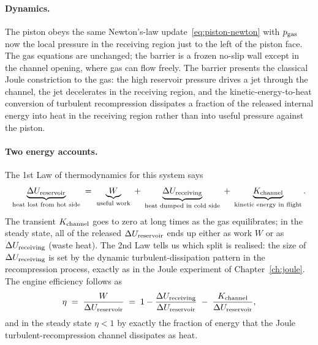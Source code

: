 \paragraph{Dynamics.}
The piston obeys the same Newton's-law update~\eqref{eq:piston-newton}
with $p_{\rm gas}$ now the local pressure in the receiving region
just to the left of the piston face. The gas equations are unchanged;
the barrier is a frozen no-slip wall except in the channel opening,
where gas can flow freely. The barrier presents the classical
Joule constriction to the gas: the high reservoir pressure drives a
jet through the channel, the jet decelerates in the receiving region,
and the kinetic-energy-to-heat conversion of turbulent
recompression dissipates a fraction of the released internal energy
into heat in the receiving region rather than into useful pressure
against the piston.

\paragraph{Two energy accounts.}
The 1st Law of thermodynamics for this system says
\begin{equation}\label{eq:piston-1st-law}
\underbrace{\Delta U_{\rm reservoir}}_{\text{heat lost from hot side}}
\;=\;
\underbrace{W}_{\text{useful work}}
\;+\;
\underbrace{\Delta U_{\rm receiving}}_{\text{heat dumped in cold side}}
\;+\;
\underbrace{K_{\rm channel}}_{\text{kinetic energy in flight}}.
\end{equation}
The transient $K_{\rm channel}$ goes to zero at long times as the gas
equilibrates; in the steady state, all of the released $\Delta U_{\rm reservoir}$
ends up either as work $W$ or as $\Delta U_{\rm receiving}$ (waste heat).
The 2nd Law tells us which split is realised: the size of
$\Delta U_{\rm receiving}$ is set by the dynamic
turbulent-dissipation pattern in the recompression process, exactly
as in the Joule experiment of Chapter~\ref{ch:joule}. The engine
efficiency follows as
\begin{equation}\label{eq:piston-eta-joule}
\eta \;=\; \frac{W}{\Delta U_{\rm reservoir}} \;=\; 1 - \frac{\Delta U_{\rm receiving}}{\Delta U_{\rm reservoir}}\;-\;\frac{K_{\rm channel}}{\Delta U_{\rm reservoir}},
\end{equation}
and in the steady state $\eta < 1$ by exactly the fraction of energy
that the Joule turbulent-recompression channel dissipates as heat.

